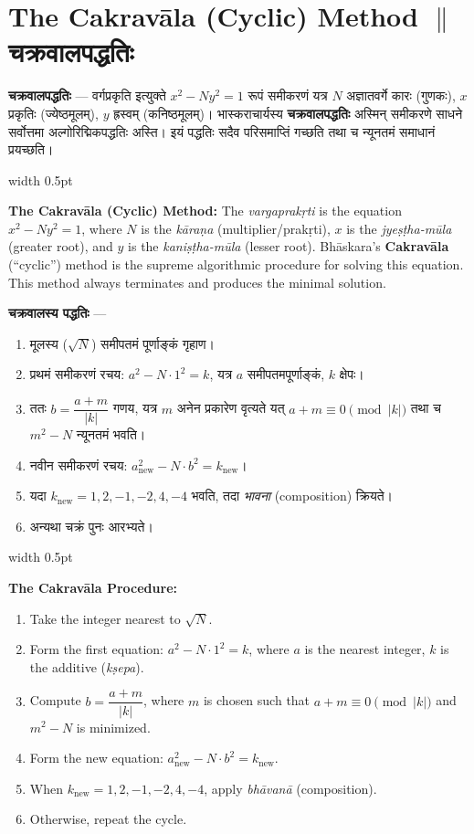 \documentclass[11pt,a4paper]{article}
\newcommand{\dev}[1]{{\devanagarifont #1}}
\newcommand{\vs}{\vspace{0.5em}}
\newcommand{\bilingual}[2]{%
  \par\vspace{0.5em}%
  \noindent\begin{minipage}[t]{0.47\textwidth}%
  \setlength{\parindent}{0pt}%
  \small #1%
  \end{minipage}%
  \hfill\textcolor{columnrule}{\vrule width 0.5pt}\hfill%
  \begin{minipage}[t]{0.47\textwidth}%
  \setlength{\parindent}{0pt}%
  \small\raggedright #2%
  \end{minipage}%
  \par\vspace{0.5em}%
}
\begin{document}
\newpage

\section*{The Cakrav\={a}la (Cyclic) Method $\parallel$ चक्रवालपद्धतिः}

\bilingual{\textbf{चक्रवालपद्धतिः} — \dev{वर्गप्रकृति} इत्युक्ते $x^2 - Ny^2 = 1$ रूपं समीकरणं यत्र $N$ अज्ञातवर्गे कारः (गुणकः), $x$ प्रकृतिः (ज्येष्ठमूलम्), $y$ ह्रस्वम् (कनिष्ठमूलम्)। भास्कराचार्यस्य \textbf{चक्रवालपद्धतिः} अस्मिन् समीकरणे साधने सर्वोत्तमा अल्गोरिद्मिकपद्धतिः अस्ति। इयं पद्धतिः सदैव परिसमाप्तिं गच्छति तथा च न्यूनतमं समाधानं प्रयच्छति।
}{%
\textbf{The Cakrav\={a}la (Cyclic) Method:} The \textit{vargaprak\d{r}ti} is the equation $x^2 - Ny^2 = 1$, where $N$ is the \textit{k\={a}ra\d{n}a} (multiplier/prak\d{r}ti), $x$ is the \textit{jye\d{s}\d{t}ha-m\={u}la} (greater root), and $y$ is the \textit{kani\d{s}\d{t}ha-m\={u}la} (lesser root). Bh\={a}skara's \textbf{Cakrav\={a}la} (``cyclic'') method is the supreme algorithmic procedure for solving this equation. This method always terminates and produces the minimal solution.}

\vs

\bilingual{\textbf{चक्रवालस्य पद्धतिः} —
\begin{enumerate}[label=\arabic*.]
\item मूलस्य ($\sqrt{N}$) समीपतमं पूर्णाङ्कं गृहाण।
\item प्रथमं समीकरणं रचय: $a^2 - N \cdot 1^2 = k$, यत्र $a$ समीपतमपूर्णाङ्कं, $k$ क्षेपः।
\item ततः $b = \dfrac{a + m}{|k|}$ गणय, यत्र $m$ अनेन प्रकारेण वृत्यते यत् $a + m \equiv 0 \pmod{|k|}$ तथा च $m^2 - N$ न्यूनतमं भवति।
\item नवीन समीकरणं रचय: $a_{\text{new}}^2 - N \cdot b^2 = k_{\text{new}}$।
\item यदा $k_{\text{new}} = 1, 2, -1, -2, 4, -4$ भवति, तदा \textit{भावना} (composition) क्रियते।
\item अन्यथा चक्रं पुनः आरभ्यते।
\end{enumerate}
}{%
\textbf{The Cakrav\={a}la Procedure:}
\begin{enumerate}[label=\arabic*.]
\item Take the integer nearest to $\sqrt{N}$.
\item Form the first equation: $a^2 - N \cdot 1^2 = k$, where $a$ is the nearest integer, $k$ is the additive (\textit{k\d{s}epa}).
\item Compute $b = \dfrac{a + m}{|k|}$, where $m$ is chosen such that $a + m \equiv 0 \pmod{|k|}$ and $m^2 - N$ is minimized.
\item Form the new equation: $a_{\text{new}}^2 - N \cdot b^2 = k_{\text{new}}$.
\item When $k_{\text{new}} = 1, 2, -1, -2, 4, -4$, apply \textit{bh\={a}van\={a}} (composition).
\item Otherwise, repeat the cycle.
\end{enumerate}}
\end{document}
